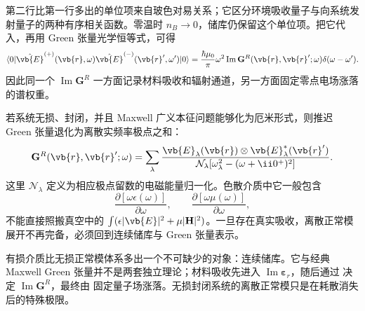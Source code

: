第二行比第一行多出的单位项来自玻色对易关系；它区分环境吸收量子与向系统发射量子的两种有序相关函数。零温时 \(n_B\to0\)，储库仍保留这个单位项。把它代入，再用 Green 张量光学恒等式，可得
\begin{equation}
{
 \langle0|\hat{\vb{E}}^{(+)}(\vb{r},\omega)
 \hat{\vb{E}}^{(-)}(\vb{r}',\omega')|0\rangle
 =\frac{\hbar\mu_0}{\pi}\omega^2
 \operatorname{Im}\mathbf G^R(\vb{r},\vb{r}';\omega)
 \delta(\omega-\omega').}
\label{eq:macqed-vacuum-field-correlation-dp68}
\end{equation}
因此同一个 \(\operatorname{Im}\mathbf G^R\) 一方面记录材料吸收和辐射通道，另一方面固定零点电场涨落的谱权重。



若系统无损、封闭，并且 Maxwell 广义本征问题能够化为厄米形式，则推迟 Green 张量退化为离散实频率极点之和：
\begin{equation}
 \mathbf G^R(\vb{r},\vb{r}';\omega)
 =\sum_\lambda
 \frac{\vb{E}_\lambda(\vb{r})\otimes\vb{E}_\lambda^*(\vb{r}')}
 {\mathcal N_\lambda[\omega_\lambda^2-(\omega+\ii0^+)^2]}.
 \label{eq:G-mode-expansion-SI-r12}
\end{equation}
这里 \(\mathcal N_\lambda\) 定义为相应极点留数的电磁能量归一化。色散介质中它一般包含
\begin{equation*}
 \frac{\partial[\omega\epsilon(\omega)]}{\partial\omega},
 \qquad
 \frac{\partial[\omega\mu(\omega)]}{\partial\omega},
\end{equation*}
不能直接照搬真空中的 \(\int(\epsilon|\vb{E}|^2+\mu|\mathbf H|^2)\)。一旦存在真实吸收，离散正常模展开不再完备，必须回到连续储库与 Green 张量表示。


有损介质比无损正常模体系多出一个不可缺少的对象：连续储库。它与经典 Maxwell Green 张量并不是两套独立理论；材料吸收先进入 \(\operatorname{Im}\boldsymbol\varepsilon_r\)，随后通过 决定 \(\operatorname{Im}\mathbf G^R\)，最终由 固定量子场涨落。无损封闭系统的离散正常模只是在耗散消失后的特殊极限。

